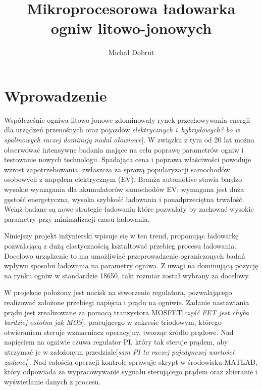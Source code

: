 \documentclass[polish,engineer]{polsl-msth}
\author{Michał Dobrut}
\title{Mikroprocesorowa ładowarka ogniw litowo-jonowych}
\begin{document}
\frontmatter
\maketitle
\makestatement
\tableofcontents
\listoftables
\listoffigures
\mainmatter

\usepackage{color}
\newcommand{\remark}[1]{{[\color{GREEN}\emph{\footnotesize #1}{}]}}

\chapter{Wprowadzenie}

Współcześnie ogniwa litowo-jonowe zdominowały rynek przechowywania energii dla urządzeń przenośnych oraz pojazdów\remark{elektrycznych i~hybrydowych? bo w spalinowych raczej dominują nadal ołowiowe}. W związku z tym od 20 lat można obserwować intensywne badania mające na celu poprawę parametrów ogniw i testowanie nowych technologii. Spadająca cena i poprawa właściwości powoduje wzrost zapotrzebowania, zwłaszcza za sprawą popularyzacji samochodów osobowych z napędem elektrycznym (EV). Branża automotive stawia bardzo wysokie wymagania dla akumulatorów samochodów EV: wymagana jest duża gęstość energetyczna, wysoka szybkość ładowania i ponadprzeciętna trwałość. Wciąż badane są nowe strategie ładowania które pozwalały by zachować wysokie parametry przy minimalizacji czasu ładowania.

Niniejszy projekt inżynierski wpisuje się w ten trend, proponując ładowarkę pozwalającą z dużą elastycznością kształtować przebieg procesu ładowania. Docelowo urządzenie to ma umożliwiać przeprowadzenie ograniczonych badań wpływu sposobu ładowania na parametry ogniwa. Z uwagi na dominującą pozycję na rynku ogniw w standardzie 18650, taki rozmiar został wybrany za docelowy. 

W projekcie położony jest nacisk na stworzenie regulatora, pozwalającego realizować założone przebiegi napięcia i prądu na ogniwie. Zadanie nastawiania prądu jest zrealizowane za pomocą tranzystora MOSFET\remark{część FET jest chyba bardziej ostotna jak MOS}, pracującego w zakresie triodowym, którego otwieraniem steruje wzmacniacz operacyjny, tworząc źródło prądowe. Nad napięciem na ogniwie czuwa regulator PI, który tak steruje prądem, aby utrzymać je w założonym przedziale\remark{sam PI to raczej pojedynczej wartości zadanej}. Nad całością operacji kontrolę sprawuje skrypt w środowisku MATLAB, który odpowiada za wypracowywanie sygnału sterującego prądem oraz zbieranie i wyświetlanie danych z procesu.
\end{document}
